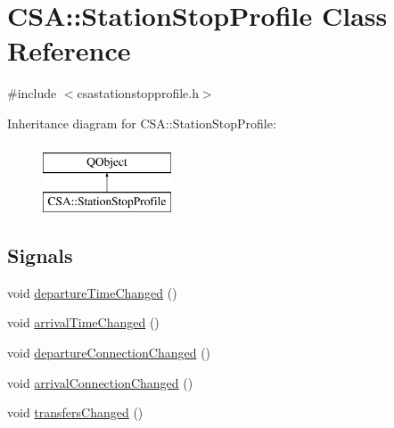 \hypertarget{classCSA_1_1StationStopProfile}{}\section{C\+SA\+:\+:Station\+Stop\+Profile Class Reference}
\label{classCSA_1_1StationStopProfile}


{\ttfamily \#include $<$csastationstopprofile.\+h$>$}

Inheritance diagram for C\+SA\+:\+:Station\+Stop\+Profile\+:\begin{figure}[H]
\begin{center}
\leavevmode
\includegraphics[height=2.000000cm]{classCSA_1_1StationStopProfile}
\end{center}
\end{figure}
\subsection*{Signals}
\begin{DoxyCompactItemize}
\item 
void \mbox{\hyperlink{classCSA_1_1StationStopProfile_a2cd652ab0ec1ab2d2a30ef175c85dc71}{departure\+Time\+Changed}} ()
\item 
void \mbox{\hyperlink{classCSA_1_1StationStopProfile_af4e461e3d6a947fd640c2c871d41f5e9}{arrival\+Time\+Changed}} ()
\item 
void \mbox{\hyperlink{classCSA_1_1StationStopProfile_a45b8bc33cb7ea716b2ed8a6ec8dd4db0}{departure\+Connection\+Changed}} ()
\item 
void \mbox{\hyperlink{classCSA_1_1StationStopProfile_a3f7b89aa6a83653ae32102ccb04175cb}{arrival\+Connection\+Changed}} ()
\item 
void \mbox{\hyperlink{classCSA_1_1StationStopProfile_a7035ce1d247c7feff5b1df96e654110f}{transfers\+Changed}} ()
\end{DoxyCompactItemize}
